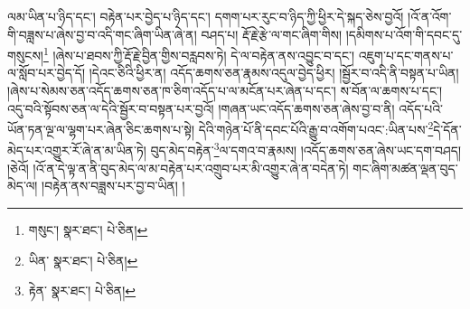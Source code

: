 ལམ་ཡིན་པ་ཉིད་དང་། བརྟེན་པར་བྱེད་པ་ཉིད་དང་། དགག་པར་རུང་བ་ཉིད་ཀྱི་ཕྱིར་དེ་སྐད་ཅེས་བྱའོ། །འོ་ན་འོག་གི་བཟླས་པ་ཞེས་བྱ་བ་འདི་གང་ཞིག་ཡིན་ཞེ་ན། བཤད་པ། རྡོ་རྗེ་རྩེ་ལ་གང་ཞིག་གིས། །དམིགས་པ་འོག་གི་དབང་དུ་གསུངས།\footnote{གསུང་།  སྣར་ཐང་།  པེ་ཅིན། } །ཞེས་པ་ཐབས་ཀྱི་རྡོ་རྗེ་བྱིན་གྱིས་བརླབས་ཏེ། དེ་ལ་བརྟེན་ནས་འབྱུང་བ་དང་། འཇུག་པ་དང་གནས་པ་ལ་སློབ་པར་བྱེད་དོ། །དེའང་ཅིའི་ཕྱིར་ན། འདོད་ཆགས་ཅན་རྣམས་འདུལ་བྱེད་ཕྱིར། །སྦྱོར་བ་འདི་ནི་བསྟན་པ་ཡིན། །ཞེས་པ་སེམས་ཅན་འདོད་ཆགས་ཅན་ཁ་ཅིག་འདོད་པ་ལ་མངོན་པར་ཞེན་པ་དང་། ས་བོན་ལ་ཆགས་པ་དང་། འདུ་བའི་སྟོབས་ཅན་ལ་དེའི་སྦྱོར་བ་བསྟན་པར་བྱའོ། །གཞན་ཡང་འདོད་ཆགས་ཅན་ཞེས་བྱ་བ་ནི། འདོད་པའི་ཡོན་ཏན་ལྔ་ལ་ལྷག་པར་ཞེན་ཅིང་ཆགས་པ་སྟེ། དེའི་གཉེན་པོ་ནི་དབང་པོའི་རྒྱུ་བ་འགོག་པའང་:ཡིན་པས་\footnote{ཡིན་  སྣར་ཐང་།  པེ་ཅིན། }དེ་དོན་མེད་པར་འགྱུར་རོ་ཞེ་ན་མ་ཡིན་ཏེ། བུད་མེད་བརྟེན་\footnote{རྟེན་  སྣར་ཐང་།  པེ་ཅིན། }ལ་དགའ་བ་རྣམས། །འདོད་ཆགས་ཅན་ཞེས་ཡང་དག་བཤད། །ཅེའོ། །འོ་ན་དེ་ལྟ་ན་ནི་བུད་མེད་ལ་མ་བརྟེན་པར་འགྲུབ་པར་མི་འགྱུར་ཞེ་ན་བདེན་ཏེ། གང་ཞིག་མཚན་ལྡན་བུད་མེད་ལ། །བརྟེན་ནས་བཟླས་པར་བྱ་བ་ཡིན། །
